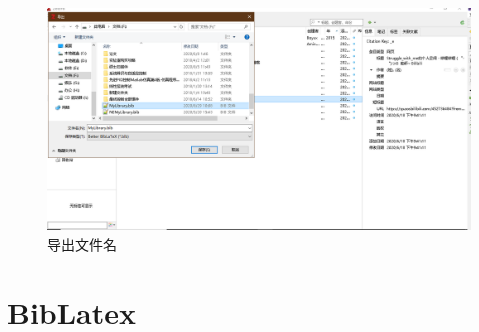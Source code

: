 \begin{figure}[htbp]
	\centering
	\includegraphics[scale=0.42]{Fig/zotero14.png}
	\caption{\label{output_name}导出文件名}
\end{figure}
\section{BibLatex}

